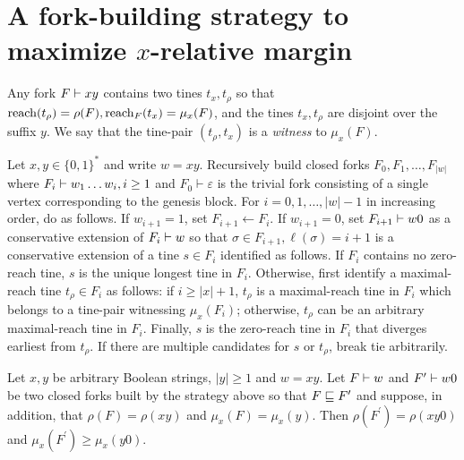 \section{A fork-building strategy to maximize \texorpdfstring{$x$-}{}relative margin}\label{sec:strategy-x}
Any fork $F \vdash xy$ contains two tines $t_x, t_\rho$ 
so that $\operatorname{reach}(t_\rho) = \rho(F), \operatorname{reach}_F(t_x) = \mu_x(F)$, 
and the tines $t_x, t_\rho$ are disjoint over the suffix $y$. 
We say that the tine-pair $(t_\rho, t_x)$ 
is a \emph{witness} to $\mu_x(F)$.


Let $x,y \in \{0,1\}^*$ and write $w = xy$. 
Recursively build closed forks $F_0, F_1, \ldots, F_{|w|}$ 
where $F_i \vdash w_1 \ldots w_i, i \geq 1$ and 
$F_0 \vdash \varepsilon$ is the trivial fork 
consisting of a single vertex 
corresponding to the genesis block. 
For $i = 0, 1, \ldots, |w| - 1$ in increasing order, do as follows.  
If $w_{i + 1} = 1$, set $F_{i+1} \leftarrow F_{i}$. 
If $w_{i+1}=0$, 
set $F_{i + 1} \vdash w0$ 
as a conservative extension of $F_i \vdash w$ so that 
$\sigma \in F_{i+1}, \ell(\sigma) = i + 1$ 
is a conservative extension of a tine $s \in F_i$ 
identified as follows. 
If $F_i$ contains no zero-reach tine, 
$s$ is the unique longest tine in $F_i$. 
Otherwise, 
first identify a maximal-reach tine $t_\rho \in F_i$ as follows:
if $i \geq |x| + 1$, $t_\rho$ is a maximal-reach tine in $F_i$ 
which belongs to a tine-pair witnessing $\mu_x(F_i)$; 
otherwise, $t_\rho$ can be an arbitrary maximal-reach tine in $F_i$. 
Finally, $s$ is the zero-reach tine in $F_i$ 
that diverges earliest from $t_\rho$. 
If there are multiple candidates for $s$ or $t_\rho$, break tie arbitrarily.






\begin{proposition}\label{prop:muxy0-lowerbound-adv}
  Let $x, y$ be arbitrary Boolean strings, $|y| \geq 1$ and $w = xy$. 
  Let $F \vdash w$ and $F^\prime \vdash w0$ be two closed forks 
  built by the strategy 
  above 
  so that $F \sqsubseteq F^\prime$ and suppose, in addition,
  that $\rho(F) = \rho(xy)$ and $\mu_x(F) = \mu_x(y)$. 
  Then $\rho(F^\prime) = \rho(xy0)$ and 
  $\mu_x(F^\prime) \geq \mu_x(y0)$.
\end{proposition}




